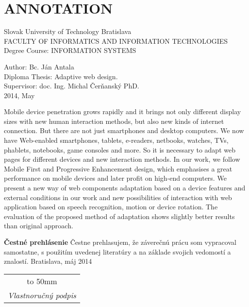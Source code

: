 \newpage

\section*{ANNOTATION}
\thispagestyle{empty}
Slovak University of Technology Bratislava\\
FACULTY OF INFORMATICS AND INFORMATION TECHNOLOGIES\\
Degree Course: INFORMATION SYSTEMS
\newline

Author: Bc. Ján Antala\\
Diploma Thesis: Adaptive web design. \\
Supervisor: doc. Ing. Michal Čerňanský PhD. \\
2014, May
\newline

Mobile device penetration grows rapidly and it brings not only different display sizes with new human interaction methods, but also new kinds of internet connection. But there are not just smartphones and desktop computers. We now have Web-enabled smartphones, tablets, e-readers, netbooks, watches, TVs, phablets, notebooks, game consoles and more. So it is necessary to adapt web pages for different devices and new interaction methods. In our work, we follow Mobile First and Progressive Enhancement design, which emphasises a great performance on mobile devices and later profit on high-end computers. We present a new way of web components adaptation based on a device features and external conditions in our work and new possibilities of interaction with web application based on speech recognition, motion or device rotation. The evaluation of the proposed method of adaptation shows slightly better results than original approach.


\pagebreak
\thispagestyle{empty}
\bigskip\vfil
 \noindent\textbf{Čestné prehlásenie}
\newline\newline
Čestne prehlasujem, že záverečnú prácu som vypracoval samostatne, s použitím uvedenej
literatúry a na základe svojich vedomostí a znalostí.
\newline\newline
\noindent Bratislava, máj 2014 \hfil
\begin{tabular}[t]{c}
\hbox to 50mm {\dotfill} \\ \textit{\small Vlastnoručný podpis}
\end{tabular}\qquad\linebreak

